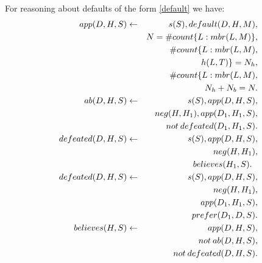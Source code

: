 \documentclass{article}
\def\naf{\: {not} \:}
\begin{document}
 For reasoning about defaults  of the form \eqref{default} we have:
% 
\begin{eqnarray}
app(D, H, S) & \leftarrow  &  s(S), default(D, H, M), \nonumber \\
        & & N  = \# count \{L : mbr(L, M)\},    \nonumber\\
        & & \# count \{L : mbr(L, M),  \nonumber\\
        & & \hspace*{.8in}h(L, T) \}= N_h,  \nonumber\\ 
        & & \# count \{L : mbr(L, M), \nonumber\\
        & & N_h+N_b=N. \label{lp:app} \\ 
ab(D, H, S)& \leftarrow &   s(S), app(D, H, S), \nonumber\\
    & &  neg(H, H_1), app(D_1, H_1, S),  \nonumber \\
    &&   \naf defeated(D_1, H_1, S).  \label{lp:ab}      \\
defeated(D, H, S) & \leftarrow  & s(S), app(D, H, S), \nonumber\\
        & &  neg(H,H_1), \nonumber \\
        & &  believes(H_1, S).  \:\:\:  \label{lp:defeat0} \\ 
defeated(D, H, S) & \leftarrow  & s(S),  app(D, H, S),    \nonumber \\ 
        & &  neg(H,H_1), \nonumber \\ %
        & & app(D_1, H_1, S), \nonumber\\
        & & prefer(D_1, D, S).   \label{lp:defeat}\\
believes(H, S) & \leftarrow & app(D, H, S), \nonumber \\
        & & \naf ab(D, H, S), \nonumber\\
        & & \naf defeated(D, H, S).  \label{lp:holds}
%    
\end{eqnarray} 
\end{document}
